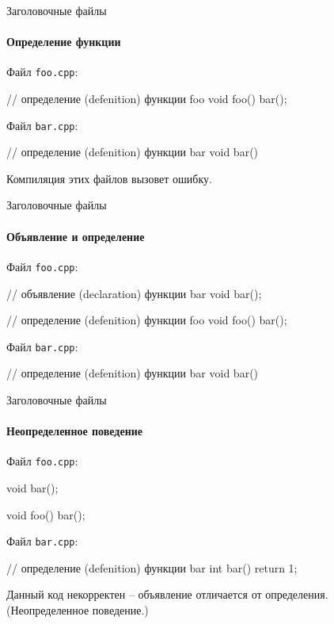 \documentclass[
    9pt,
    hyperref={pdfencoding=unicode}
    ]{beamer}
\begin{document}
\begin{frame}[fragile]{Заголовочные файлы}
    \framesubtitle{Определение функции}
    Файл \texttt{foo.cpp}:
    \begin{cppcode}
        // определение (defenition) функции foo
        void foo()
        {
            bar();        
        }
    \end{cppcode}
        
    \vspace{2em}
    Файл \texttt{bar.cpp}:
    \begin{cppcode}
        // определение (defenition) функции bar
        void bar(){ }
    \end{cppcode}
    
    \vspace{2em}
    Компиляция этих файлов вызовет ошибку.
\end{frame}

\begin{frame}[fragile]{Заголовочные файлы}
\framesubtitle{Объявление  и определение}
    Файл \texttt{foo.cpp}:
    \begin{cppcode}
        // объявление (declaration) функции bar
        void bar();
        
        // определение (defenition) функции foo
        void foo()
        {
            bar();        
        }
    \end{cppcode}

    \vspace{2em}
    Файл \texttt{bar.cpp}:
    \begin{cppcode}
        // определение (defenition) функции bar
        void bar(){ }
    \end{cppcode}
\end{frame}


\begin{frame}[fragile]{Заголовочные файлы}
\framesubtitle{Неопределенное поведение}
    Файл \texttt{foo.cpp}:
    \begin{cppcode}
        void bar();
        
        void foo()
        {
            bar();        
        }
    \end{cppcode}

    \vspace{2em}
    Файл \texttt{bar.cpp}:
    \begin{cppcode}
        // определение (defenition) функции bar
        int bar(){ return 1; }
    \end{cppcode}

    \vspace{2em}
    Данный код некорректен -- объявление отличается от определения. (Неопределенное поведение.)
\end{frame}
\end{document}
